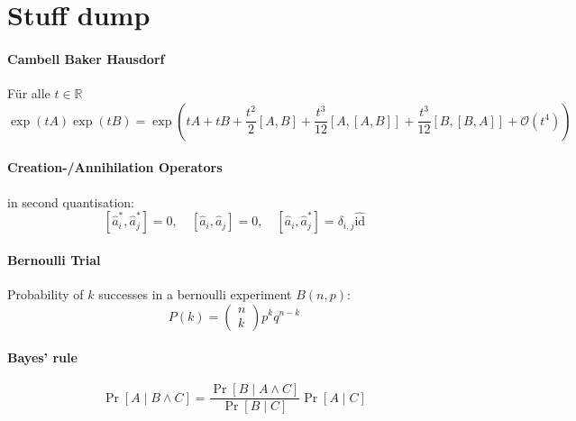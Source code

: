 




\usepackage[arrow, matrix, curve]{xy}
\usepackage{wrapfig}
\usepackage{bm}
\usepackage{multicol}
\usepackage{xcolor}
\usepackage{mathrsfs} 
\usepackage{bbm}
\renewcommand\vec{\boldsymbol}




\section{Stuff dump}

\paragraph{Cambell Baker Hausdorf} Für alle $t \in \mathbb{R}$ 
$$ 
\exp(t A) \exp(t B)= \exp \left(t A+t B+\frac{t^2}{2}[A, B]
+\frac{t^3}{12} [A,[A, B]] +\frac{t^3}{12}[B,[B, A]]+\mathscr{O}\left(t^4\right)\right)
$$

\paragraph{Creation-/Annihilation Operators}in second quantisation:
$$\left[\hat{a}_i^*, \hat{a}_j^*\right]=0, \quad\left[\hat{a}_i, \hat{a}_j\right]=0, \quad\left[\hat{a}_i, \hat{a}_j^*\right]=\delta_{i, j} \hat{\mathrm{id}}$$


\paragraph{Bernoulli Trial} Probability of $k$ successes in a bernoulli experiment $B(n,p)$:
$$P(k)=\left(\begin{array}{l}
  n \\
  k
  \end{array}\right) p^k q^{n-k} $$

\paragraph{Bayes' rule}  $$
\operatorname{Pr}[A \mid B \wedge C]=\frac{\operatorname{Pr}[B \mid A \wedge C]}{\operatorname{Pr}[B \mid C]} \operatorname{Pr}[A \mid C]
$$

